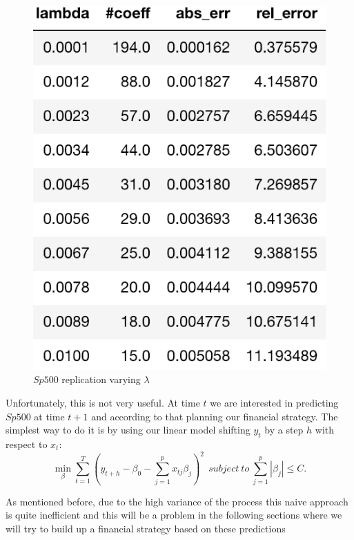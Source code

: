 \documentclass{article}%
\begin{document}
\begin{figure}[h!]
  \centering
  \includegraphics[scale=0.6]{err_lambda.png}
  \caption{$Sp500$ replication varying $\lambda$}
  \label{err_alpha}
\end{figure}

Unfortunately, this is not very useful. At time $t$ we are interested in predicting $Sp500$ at time $t+1$ and according to that planning our financial strategy. The simplest way to do it is by using our linear model shifting $y_t$ by a step $h$ with respect to $x_t$:
\begin{equation}
 \min_{\beta} \sum_{t=1}^T ( y_{t+h} -\beta_0 -\sum_{j=1}^p x_{tj} \beta_j)^2 ~~subject~to~\sum_{j=1}^p |\beta_j| \leq C.
\end{equation}

As mentioned before, due to the high variance of the process this naive approach is quite inefficient and this will be a problem in the following sections where we will try to build up a financial strategy based on these predictions
\end{document}
